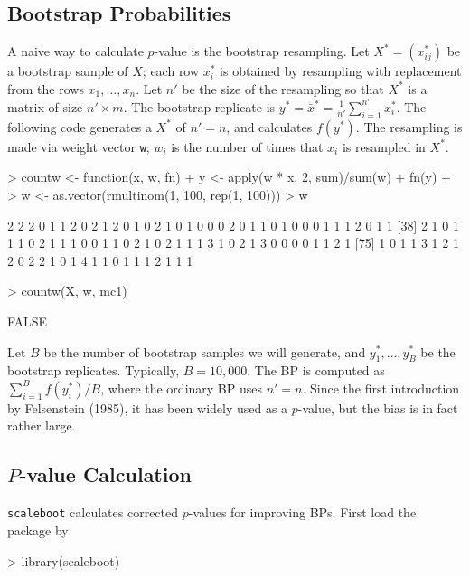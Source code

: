\documentclass[a4paper]{amsart}
\begin{document}
\subsection{Bootstrap Probabilities}

A naive way to calculate $p$-value is the bootstrap resampling.  Let
$X^*=(x^*_{ij})$ be a bootstrap sample of $X$; each row $x^*_i$ is
obtained by resampling with replacement from the rows
$x_1,\ldots,x_n$.  Let $n'$ be the size of the resampling so that
$X^*$ is a matrix of size $n'\times m$. The bootstrap replicate is
$y^* = \bar x^* = \tfrac{1}{n'} \sum_{i=1}^{n'} x_i^*$. The following
code generates a $X^*$ of $n'=n$, and calculates $f(y^*)$. The
resampling is made via weight vector {\tt w}; $w_i$ is the number of
times that $x_i$ is resampled in $X^*$.
\begin{Schunk}
\begin{Sinput}
> countw <- function(x, w, fn) {
+     y <- apply(w * x, 2, sum)/sum(w)
+     fn(y)
+ }
> w <- as.vector(rmultinom(1, 100, rep(1, 100)))
> w
\end{Sinput}
\begin{Soutput}
  [1] 2 2 2 0 1 1 2 0 2 1 2 0 1 0 2 1 0 1 0 0 0 2 0 1 1 0 1 0 0 0 1 1 1 2 0 1 1
 [38] 2 1 0 1 1 1 0 2 1 1 1 0 0 1 1 0 2 1 0 2 1 1 1 3 1 0 2 1 3 0 0 0 0 1 1 2 1
 [75] 1 0 1 1 3 1 2 1 2 0 2 2 1 0 1 4 1 1 0 1 1 1 2 1 1 1
\end{Soutput}
\begin{Sinput}
> countw(X, w, mc1)
\end{Sinput}
\begin{Soutput}
[1] FALSE
\end{Soutput}
\end{Schunk}

Let $B$ be the number of bootstrap samples we will generate, and
$y^*_1,\ldots, y^*_B$ be the bootstrap replicates. Typically,
$B=10,000$. The BP is computed as $\sum_{i=1}^B f(y^*_i)/B$, where the
ordinary BP uses $n'=n$.  Since the first introduction by Felsenstein
(1985), it has been widely used as a $p$-value, but the bias is in
fact rather large.


\subsection{$P$-value Calculation}

{\tt scaleboot} calculates corrected $p$-values for improving BPs.
First load the package by
\begin{Schunk}
\begin{Sinput}
> library(scaleboot)
\end{Sinput}
\end{Schunk}
\end{document}
